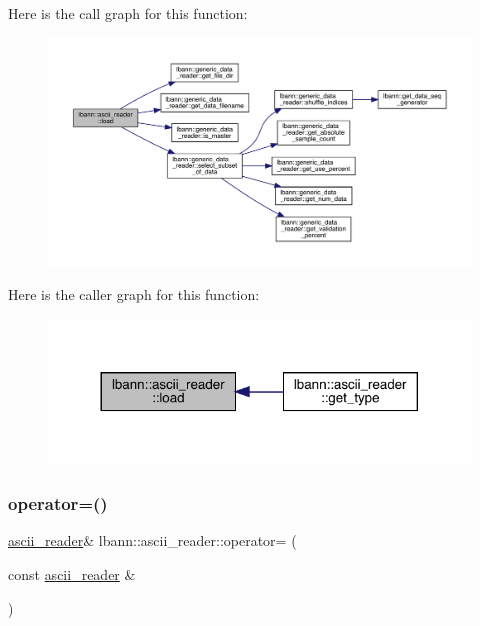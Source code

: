 Here is the call graph for this function\+:\nopagebreak
\begin{figure}[H]
\begin{center}
\leavevmode
\includegraphics[width=350pt]{classlbann_1_1ascii__reader_a678254a9d1c90459a1502d63e36a2b61_cgraph}
\end{center}
\end{figure}
Here is the caller graph for this function\+:\nopagebreak
\begin{figure}[H]
\begin{center}
\leavevmode
\includegraphics[width=317pt]{classlbann_1_1ascii__reader_a678254a9d1c90459a1502d63e36a2b61_icgraph}
\end{center}
\end{figure}
\mbox{\label{classlbann_1_1ascii__reader_a83acb780b4d43302bef4324a9d307749}} 
\subsubsection{\texorpdfstring{operator=()}{operator=()}}
{\footnotesize\ttfamily \hyperlink{classlbann_1_1ascii__reader}{ascii\+\_\+reader}\& lbann\+::ascii\+\_\+reader\+::operator= (\begin{DoxyParamCaption}\item[{const \hyperlink{classlbann_1_1ascii__reader}{ascii\+\_\+reader} \&}]{ }\end{DoxyParamCaption})\hspace{0.3cm}{\ttfamily [default]}}



